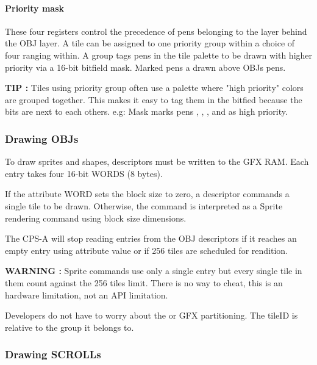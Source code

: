 \paragraph{Priority mask}
These four registers control the precedence of pens belonging to the layer behind the OBJ layer. A tile can be assigned to one priority group within a choice of four ranging within\icode{[0-3]}. A group tags pens in the tile palette to be drawn with higher priority via a 16-bit bitfield mask. Marked pens a drawn above OBJs pens.



 

\textbf{TIP :} Tiles using priority group often use a palette where "high priority" colors are grouped together. This makes it easy to tag them in the bitfied because the bits are next to each others. e.g: Mask  marks pens , , , and  as high priority.




\subsubsection{Drawing OBJs}
To draw sprites and shapes, descriptors must be written to the GFX RAM. Each entry takes four 16-bit WORDS (8 bytes).

 


  

If the attribute WORD sets the block size to zero, a descriptor commands a single tile to be drawn. Otherwise, the command is interpreted as a Sprite rendering command using block size dimensions.

The CPS-A will stop reading entries from the OBJ descriptors if it reaches an empty entry using attribute value  or if 256 tiles are scheduled for rendition.

\textbf{WARNING :} Sprite commands use only a single entry but every single tile in them count against the 256 tiles limit. There is no way to cheat, this is an hardware limitation, not an API limitation.


Developers do not have to worry about the  or GFX partitioning. The tileID is relative to the group it belongs to.

\subsubsection{Drawing SCROLLs}

